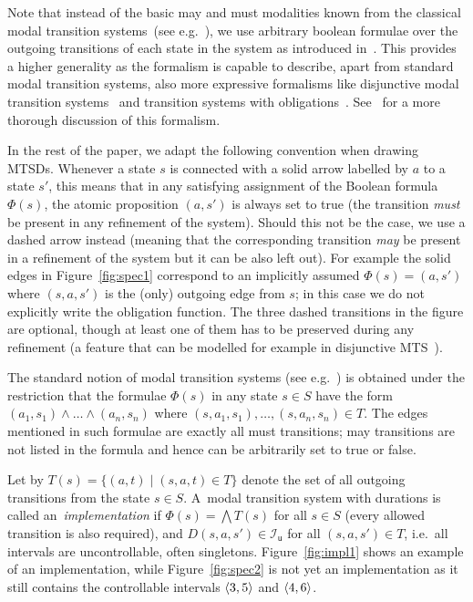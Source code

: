 Note that instead of the basic may and must modalities known
from the classical modal transition  %
systems~(see e.g.~\cite{AHLNW:EATCS:08}), we use
arbitrary boolean formulae over the outgoing transitions of each
state in the system as introduced in~\cite{BKLMS:ATVA:11}. This provides
a higher generality as the formalism is capable to describe, 
apart from standard modal transition systems, also more expressive formalisms
like disjunctive modal transition 
systems~\cite{DBLP:conf/lics/LarsenX90} and transition systems with 
obligations~\cite{benes_et_al:OASIcs:2011:3070}. 
See~\cite{BKLMS:ATVA:11} for a more thorough discussion of this formalism.

In the rest of the paper, 
we adapt the following convention when drawing MTSDs.
Whenever a state $s$ is connected with a solid arrow labelled by $a$
to a state $s'$, this means that in any satisfying assignment of the Boolean
formula $\Phi(s)$, the atomic proposition $(a,s')$ is always set
to true (the transition \emph{must} be present in any refinement of the system).
Should this not be the case, we use a dashed arrow instead (meaning
that the corresponding transition \emph{may} be present in a refinement
of the system but it can be also left out). 
For example the solid edges in Figure~\ref{fig:spec1} correspond
to an implicitly assumed $\Phi(s) = (a,s')$ where $(s,a,s')$ is the
(only) outgoing edge from $s$; in this case we do not explicitly 
write the obligation
function. The three dashed transitions in the figure
are optional, though at least one of them has to
be preserved during any refinement (a feature that can be
modelled for example in disjunctive MTS~\cite{DBLP:conf/lics/LarsenX90}).

\begin{remark} \label{rem:mts}
The standard notion of modal transition systems 
(see e.g.~\cite{AHLNW:EATCS:08}) is obtained
under the restriction that the formulae $\Phi(s)$ in any state $s \in S$
have the form $(a_1,s_1) \wedge \ldots \wedge (a_n,s_n)$
where $(s,a_1,s_1), \ldots, (s,a_n,s_n) \in T$. The edges mentioned in
such formulae are exactly all must transitions; may transitions are not 
listed in the formula and hence can be arbitrarily set to true or false.  
\end{remark}
Let by $T(s) = \{(a,t)\mid (s,a,t) \in T\}$ denote the set of all 
outgoing transitions from the state $s \in S$.
A~modal transition system with durations is called an~\emph{implementation}
if $\Phi(s) = \bigwedge T(s)$ for all $s \in S$ (every allowed transition
is also required), and 
$D(s,a,s') \in \mathcal I_\mathsf u$ for all $(s,a,s') \in T$, i.e.~all
intervals are uncontrollable, often singletons.  Figure~\ref{fig:impl1} shows
an example of an implementation, while
Figure~\ref{fig:spec2} is not yet an implementation as it still contains
the controllable intervals $\langle3,5\rangle$ and $\langle4,6\rangle$.

